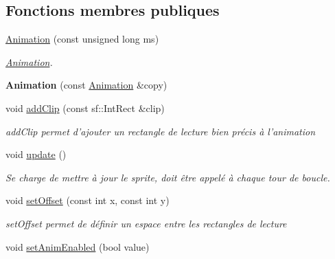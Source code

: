 \subsection*{Fonctions membres publiques}
\begin{DoxyCompactItemize}
\item 
\hyperlink{class_animation_ac63043b48932c071fc99e47f7a2eed46}{Animation} (const unsigned long ms)
\begin{DoxyCompactList}\small\item\em \hyperlink{class_animation}{Animation}. \end{DoxyCompactList}\item 
\hypertarget{class_animation_ae9b63e2f6124b1bffaea0d4ccb9644dd}{{\bfseries Animation} (const \hyperlink{class_animation}{Animation} \&copy)}\label{class_animation_ae9b63e2f6124b1bffaea0d4ccb9644dd}

\item 
void \hyperlink{class_animation_a52a17d646d9009a42c830b3172dbcafd}{add\+Clip} (const sf\+::\+Int\+Rect \&clip)
\begin{DoxyCompactList}\small\item\em add\+Clip permet d'ajouter un rectangle de lecture bien précis à l'animation \end{DoxyCompactList}\item 
\hypertarget{class_animation_a4318baf0b0735e7da87b2c6d3d3a2705}{void \hyperlink{class_animation_a4318baf0b0735e7da87b2c6d3d3a2705}{update} ()}\label{class_animation_a4318baf0b0735e7da87b2c6d3d3a2705}

\begin{DoxyCompactList}\small\item\em Se charge de mettre à jour le sprite, doit être appelé à chaque tour de boucle. \end{DoxyCompactList}\item 
\hypertarget{class_animation_acb9fc2c5f63aa1dbe17c35841531c1e7}{void \hyperlink{class_animation_acb9fc2c5f63aa1dbe17c35841531c1e7}{set\+Offset} (const int x, const int y)}\label{class_animation_acb9fc2c5f63aa1dbe17c35841531c1e7}

\begin{DoxyCompactList}\small\item\em set\+Offset permet de définir un espace entre les rectangles de lecture \end{DoxyCompactList}\item 
\hypertarget{class_animation_a001598cc4fd8456ee4f23c5ff3fb31f4}{void \hyperlink{class_animation_a001598cc4fd8456ee4f23c5ff3fb31f4}{set\+Anim\+Enabled} (bool value)}\label{class_animation_a001598cc4fd8456ee4f23c5ff3fb31f4}


\end{DoxyCompactItemize}
